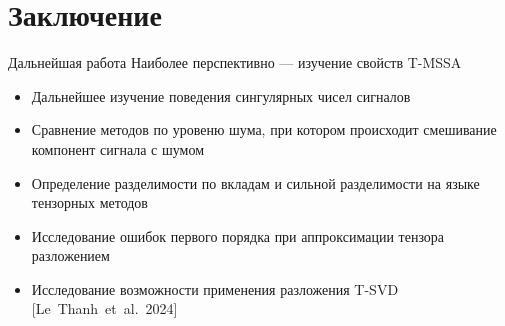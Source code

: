 \documentclass[pdf, unicode, 10pt, notheorems, handout]{beamer}
\begin{document}
\section{Заключение}
\begin{frame}{Дальнейшая работа}
  Наиболее перспективно --- изучение свойств T-MSSA\bigskip
  \begin{itemize}
    \item Дальнейшее изучение поведения сингулярных чисел сигналов\medskip
    \item Сравнение методов по уровеню шума, при котором
      происходит смешивание компонент сигнала с шумом\medskip
    \item Определение разделимости по вкладам и сильной
      разделимости на языке тензорных методов\medskip
    \item Исследование ошибок первого порядка при
      аппроксимации тензора разложением\medskip
    \item Исследование возможности применения разложения T-SVD
      [Le~Thanh~et~al.~2024]
  \end{itemize}
\end{frame}
\end{document}
